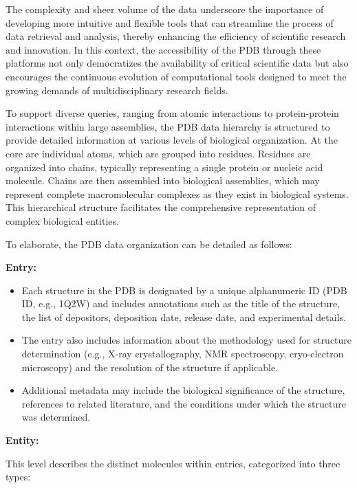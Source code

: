 The complexity and sheer volume of the data underscore the importance of developing more intuitive and flexible tools that can streamline the process of data retrieval and analysis, thereby enhancing the efficiency of scientific research and innovation. In this context, the accessibility of the PDB through these platforms not only democratizes the availability of critical scientific data but also encourages the continuous evolution of computational tools designed to meet the growing demands of multidisciplinary research fields.

To support diverse queries, ranging from atomic interactions to protein-protein interactions within large assemblies, the PDB data hierarchy is structured to provide detailed information at various levels of biological organization. At the core are individual atoms, which are grouped into residues. Residues are organized into chains, typically representing a single protein or nucleic acid molecule. Chains are then assembled into biological assemblies, which may represent complete macromolecular complexes as they exist in biological systems. This hierarchical structure facilitates the comprehensive representation of complex biological entities.

To elaborate, the PDB data organization can be detailed as follows:

\textbf{Entry:}

\begin{itemize}
\tightlist
\item
  Each structure in the PDB is designated by a unique alphanumeric ID (PDB ID, e.g., 1Q2W) and includes annotations such as the title of the structure, the list of depositors, deposition date, release date, and experimental details.
\item
  The entry also includes information about the methodology used for structure determination (e.g., X-ray crystallography, NMR spectroscopy, cryo-electron microscopy) and the resolution of the structure if applicable.
\item
  Additional metadata may include the biological significance of the structure, references to related literature, and the conditions under which the structure was determined.
\end{itemize}

\textbf{Entity:}

This level describes the distinct molecules within entries, categorized into three types:

